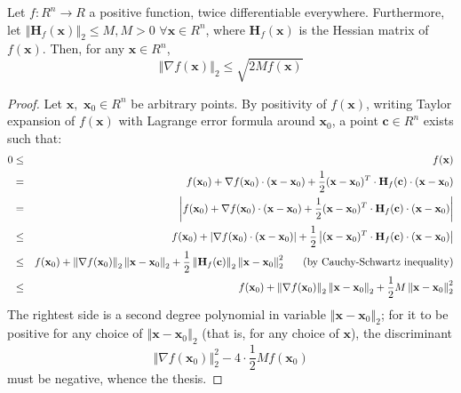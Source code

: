 \documentclass[12pt]{article}
\begin{document}
Let $f:R^{n}\rightarrow R$ a positive function, twice
differentiable everywhere. Furthermore, let $\left\Vert \mathbf{H}_{f}(%
\mathbf{x})\right\Vert _{2}\leq M,M>0$ $\forall \mathbf{x}\in R^{n}$, where $%
\mathbf{H}_{f}(\mathbf{x})$ is the Hessian matrix of $f(\mathbf{x})$.
Then, for any $\mathbf{x}\in R^{n}$,
\[
\left\Vert \nabla f(\mathbf{x})\right\Vert _{2}\leq \sqrt{2Mf(\mathbf{x})}
\]

\begin{proof}
Let $\mathbf{x},$ $\mathbf{x}_{0}\in R^{n}$ be arbitrary points. By
positivity of $f(\mathbf{x})$, writing Taylor expansion of $f(\mathbf{x})$
with Lagrange error formula around $\mathbf{x}_{0}$, a point $\mathbf{c}\in
R^{n}$ exists such that:
\begin{eqnarray*}
0 &\leq &f(\mathbf{x}) \\
&=&f(\mathbf{x}_{0})+\nabla f(\mathbf{x}_{0})\cdot (\mathbf{x}-\mathbf{x}%
_{0})+\frac{1}{2}(\mathbf{x}-\mathbf{x}_{0})^{T}\cdot \mathbf{H}_{f}(\mathbf{%
c})\cdot (\mathbf{x}-\mathbf{x}_{0}) \\
&=&\left\vert f(\mathbf{x}_{0})+\nabla f(\mathbf{x}_{0})\cdot (\mathbf{x}-%
\mathbf{x}_{0})+\frac{1}{2}(\mathbf{x}-\mathbf{x}_{0})^{T}\cdot \mathbf{H}%
_{f}(\mathbf{c})\cdot (\mathbf{x}-\mathbf{x}_{0})\right\vert  \\
&\leq &f(\mathbf{x}_{0})+\left\vert \nabla f(\mathbf{x}_{0})\cdot (\mathbf{x}%
-\mathbf{x}_{0})\right\vert +\frac{1}{2}\left\vert (\mathbf{x}-\mathbf{x}%
_{0})^{T}\cdot \mathbf{H}_{f}(\mathbf{c})\cdot (\mathbf{x}-\mathbf{x}%
_{0})\right\vert  \\
&\leq &f(\mathbf{x}_{0})+\left\Vert \nabla f(\mathbf{x}_{0})\right\Vert
_{2}\left\Vert \mathbf{x}-\mathbf{x}_{0}\right\Vert _{2}+\frac{1}{2}%
\left\Vert \mathbf{H}_{f}(\mathbf{c})\right\Vert _{2}\left\Vert \mathbf{x}-%
\mathbf{x}_{0}\right\Vert _{2}^{2}\text{\ \ \ \ \ (by Cauchy-Schwartz
inequality)} \\
&\leq &f(\mathbf{x}_{0})+\left\Vert \nabla f(\mathbf{x}_{0})\right\Vert
_{2}\left\Vert \mathbf{x}-\mathbf{x}_{0}\right\Vert _{2}+\frac{1}{2}%
M\left\Vert \mathbf{x}-\mathbf{x}_{0}\right\Vert _{2}^{2}
\end{eqnarray*}
The rightest side is a second degree polynomial in variable $\left\Vert 
\mathbf{x}-\mathbf{x}_{0}\right\Vert _{2}$; for it to be positive for any
choice of $\left\Vert \mathbf{x}-\mathbf{x}_{0}\right\Vert _{2}$ (that is,
for any choice of $\mathbf{x}$), the discriminant
\[
\left\Vert \nabla f(\mathbf{x}_{0})\right\Vert _{2}^{2}-4\cdot \frac{1}{2}Mf(%
\mathbf{x}_{0})
\]
must be negative, whence the thesis.
\end{proof}
\end{document}
